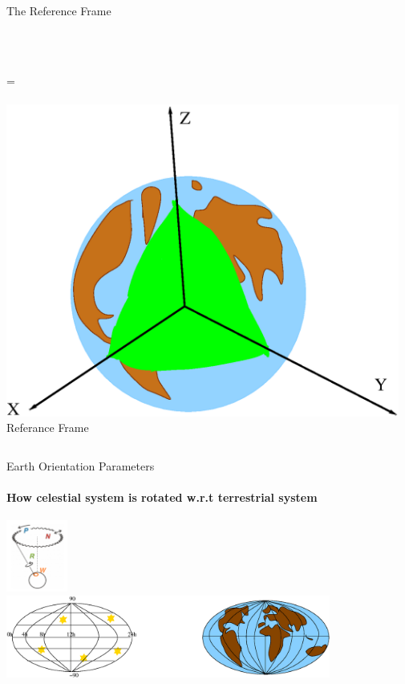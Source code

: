 \documentclass[12pt]{beamer}
\begin{document}
\begin{frame}{The Reference Frame}
\begin{columns}
    \\ \ \\ 
      =
    \\ \ \\ 
        \includegraphics[width=0.97\textwidth]{figure/referanseramme.eps}\\ Referance Frame
  \end{columns}
\end{frame}


\begin{frame}{Earth Orientation Parameters}
  \framesubtitle{How celestial system is rotated w.r.t terrestrial system}
  \begin{center}
    \includegraphics[width=0.15\textwidth]{figure/eop_parameters.png}
    \\
    \includegraphics[width=0.8\textwidth]{figure/eop.eps}
  \end{center}
\end{frame}
\end{document}
